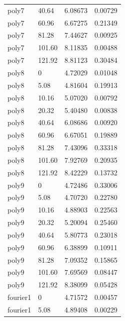 \begin{onehalfspace}
\begin{longtable}{p{2.0cm} p{2.0cm} p{4.0cm} p{2.0cm} }
        poly7     & 40.64        & 6.08673          & 0.00729 \\
        poly7     & 60.96        & 6.67275          & 0.21349 \\
        poly7     & 81.28        & 7.44627          & 0.00925 \\
        poly7     & 101.60       & 8.11835          & 0.00488 \\
        poly7     & 121.92       & 8.81123          & 0.30484 \\
        \midrule
        poly8     & 0            & 4.72029          & 0.01048 \\
        poly8     & 5.08         & 4.81604          & 0.19913 \\
        poly8     & 10.16        & 5.07020          & 0.00792 \\
        poly8     & 20.32        & 5.40480          & 0.00838 \\
        poly8     & 40.64        & 6.08686          & 0.00920 \\
        poly8     & 60.96        & 6.67051          & 0.19889 \\
        poly8     & 81.28        & 7.43096          & 0.33318 \\
        poly8     & 101.60       & 7.92769          & 0.20935 \\
        poly8     & 121.92       & 8.42229          & 0.13732 \\
        \midrule
        poly9     & 0            & 4.72486          & 0.33006 \\
        poly9     & 5.08         & 4.70720          & 0.22780 \\
        poly9     & 10.16        & 4.88903          & 0.22563 \\
        poly9     & 20.32        & 5.20094          & 0.25460 \\
        poly9     & 40.64        & 5.80773          & 0.23018 \\
        poly9     & 60.96        & 6.38899          & 0.10911 \\
        poly9     & 81.28        & 7.09352          & 0.15865 \\
        poly9     & 101.60       & 7.69569          & 0.08447 \\
        poly9     & 121.92       & 8.38099          & 0.05428 \\
        \midrule
        fourier1  & 0            & 4.71572          & 0.00457 \\
        fourier1  & 5.08         & 4.89408          & 0.00229 \\

\end{longtable}
\end{onehalfspace}
